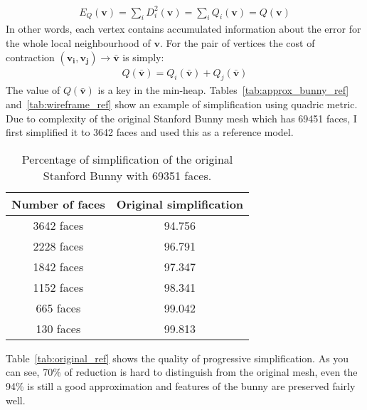 \begin{align}
E_Q(\mathbf{v}) = \sum_{i} D_i^2(\mathbf{v}) = \sum_{i} Q_i(\mathbf{v}) = Q(\mathbf{v})
\end{align}
In other words, each vertex contains accumulated information about the error for the whole local neighbourhood of $\mathbf{v}$. For the pair of vertices the cost of contraction $(\mathbf{v_i}, \mathbf{v_j})\rightarrow\bar{\mathbf{v}}$ is simply:
\begin{align}
Q(\mathbf{\bar{v}}) = Q_i(\mathbf{\bar{v}}) + Q_j(\mathbf{\bar{v}})
\end{align}
The value of $Q(\mathbf{\bar{v}})$ is a key in the min-heap. Tables~\ref{tab:approx_bunny_ref} and~\ref{tab:wireframe_ref} show an example of simplification using quadric metric. Due to complexity of the original Stanford Bunny mesh which has 69451 faces, I first simplified it to 3642 faces and used this as a reference model.

\begin{table}[h!]
\centering
\begin{tabular}{ |c|c| } 
 \hline
 Number of faces & Original simplification\\
 \hline
 3642 faces & 94.756 \\ 
 2228 faces & 96.791 \\ 
 1842 faces & 97.347\\ 
 1152 faces & 98.341\\ 
 665 faces & 99.042\\ 
 130 faces & 99.813\\
 \hline
\end{tabular}
\caption{Percentage of simplification of the original Stanford Bunny with 69351 faces.}
\end{table}
Table~\ref{tab:original_ref} shows the quality of progressive simplification. As you can see, 70\% of reduction is hard to distinguish from the original mesh, even the 94\% is still a good approximation and features of the bunny are preserved fairly well.

